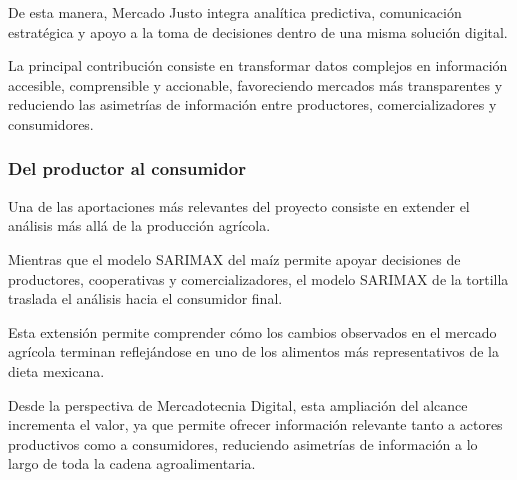 \documentclass[11pt]{article}
\begin{document}
De esta manera, Mercado Justo integra analítica predictiva, comunicación
estratégica y apoyo a la toma de decisiones dentro de una misma solución
digital.

La principal contribución consiste en transformar datos complejos en
información accesible, comprensible y accionable, favoreciendo mercados
más transparentes y reduciendo las asimetrías de información entre
productores, comercializadores y consumidores.

    \hypertarget{del-productor-al-consumidor}{%
\subsubsection{Del productor al
consumidor}\label{del-productor-al-consumidor}}

Una de las aportaciones más relevantes del proyecto consiste en extender
el análisis más allá de la producción agrícola.

Mientras que el modelo SARIMAX del maíz permite apoyar decisiones de
productores, cooperativas y comercializadores, el modelo SARIMAX de la
tortilla traslada el análisis hacia el consumidor final.

Esta extensión permite comprender cómo los cambios observados en el
mercado agrícola terminan reflejándose en uno de los alimentos más
representativos de la dieta mexicana.

Desde la perspectiva de Mercadotecnia Digital, esta ampliación del
alcance incrementa el valor, ya que permite ofrecer información
relevante tanto a actores productivos como a consumidores, reduciendo
asimetrías de información a lo largo de toda la cadena agroalimentaria.
\end{document}
